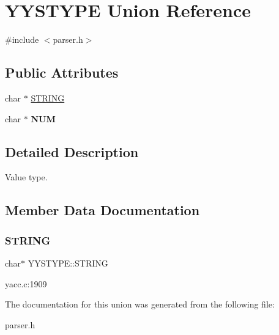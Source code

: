 \hypertarget{unionYYSTYPE}{}\section{Y\+Y\+S\+T\+Y\+PE Union Reference}
\label{unionYYSTYPE}


{\ttfamily \#include $<$parser.\+h$>$}

\subsection*{Public Attributes}
\begin{DoxyCompactItemize}
\item 
char $\ast$ \hyperlink{unionYYSTYPE_a48739ab48c4c859d0411bdc538f46a4f}{S\+T\+R\+I\+NG}
\item 
\mbox{\label{unionYYSTYPE_a61e375237e5938b15787439d72067515}} 
char $\ast$ {\bfseries N\+UM}
\end{DoxyCompactItemize}


\subsection{Detailed Description}
Value type. 

\subsection{Member Data Documentation}
\mbox{\label{unionYYSTYPE_a48739ab48c4c859d0411bdc538f46a4f}} 
\subsubsection{\texorpdfstring{S\+T\+R\+I\+NG}{STRING}}
{\footnotesize\ttfamily char$\ast$ Y\+Y\+S\+T\+Y\+P\+E\+::\+S\+T\+R\+I\+NG}

yacc.\+c\+:1909 

The documentation for this union was generated from the following file\+:\begin{DoxyCompactItemize}
\item 
parser.\+h\end{DoxyCompactItemize}
